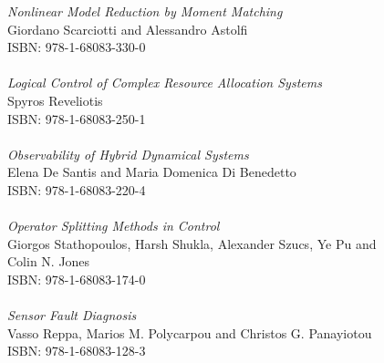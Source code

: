 \vspace{12pt}
\noindent \textit{Nonlinear Model Reduction by Moment Matching}\\
Giordano Scarciotti and Alessandro Astolfi\\
ISBN: 978-1-68083-330-0\\
\\
\noindent \textit{Logical Control of Complex Resource Allocation Systems}\\
Spyros Reveliotis\\
ISBN: 978-1-68083-250-1\\
\\
\noindent \textit{Observability of Hybrid Dynamical Systems}\\
Elena De Santis and Maria Domenica Di Benedetto\\
ISBN: 978-1-68083-220-4\\
\\
\noindent \textit{Operator Splitting Methods in Control}\\
Giorgos Stathopoulos, Harsh Shukla, Alexander Szucs, Ye Pu and\\ Colin N. Jones\\
ISBN: 978-1-68083-174-0\\
\\
\noindent \textit{Sensor Fault Diagnosis}\\
Vasso Reppa, Marios M. Polycarpou and Christos G. Panayiotou\\
ISBN: 978-1-68083-128-3
